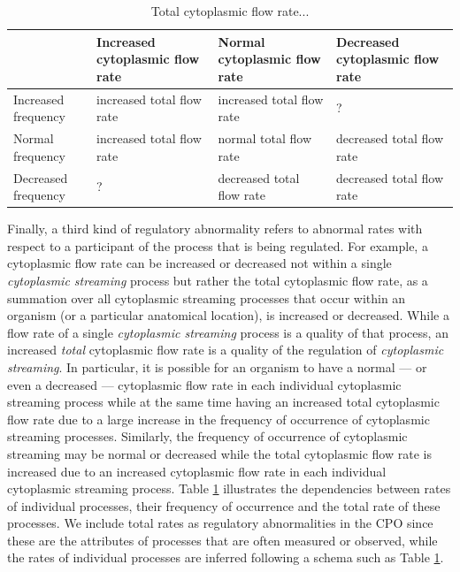 \documentclass{bioinfo}
\begin{document}
\begin{table}
  \centering
  \begin{tabular}{l|l|l|l}
    & Increased cytoplasmic flow rate & Normal cytoplasmic flow rate & Decreased
    cytoplasmic flow rate \\
    \hline
    Increased frequency &increased total flow rate &increased total
    flow rate &?\\
    Normal frequency &increased total flow rate &normal total flow
    rate &decreased total flow rate\\
    Decreased frequency &?&decreased total flow rate &decreased total
    flow rate\\
    \hline
  \end{tabular}
  \caption{\label{tbl:flow}Total cytoplasmic flow rate...}
\end{table}

Finally, a third kind of regulatory abnormality refers to abnormal
rates with respect to a participant of the process that is being
regulated. For example, a cytoplasmic flow rate can be increased or
decreased not within a single {\em cytoplasmic streaming} process but
rather the total cytoplasmic flow rate, as a summation over all
cytoplasmic streaming processes that occur within an organism (or a
particular anatomical location), is increased or decreased. While a
flow rate of a single {\em cytoplasmic streaming} process is a quality
of that process, an increased {\em total} cytoplasmic flow rate is a
quality of the regulation of {\em cytoplasmic streaming}. In
particular, it is possible for an organism to have a normal --- or
even a decreased --- cytoplasmic flow rate in each individual
cytoplasmic streaming process while at the same time having an
increased total cytoplasmic flow rate due to a large increase in the
frequency of occurrence of cytoplasmic streaming processes. Similarly,
the frequency of occurrence of cytoplasmic streaming may be normal or
decreased while the total cytoplasmic flow rate is increased due to an
increased cytoplasmic flow rate in each individual cytoplasmic
streaming process. Table \ref{tbl:flow} illustrates the dependencies
between rates of individual processes, their frequency of occurrence
and the total rate of these processes. We include total rates as
regulatory abnormalities in the CPO since these are the attributes of
processes that are often measured or observed, while the rates of
individual processes are inferred following a schema such as Table
\ref{tbl:flow}.
\end{document}
